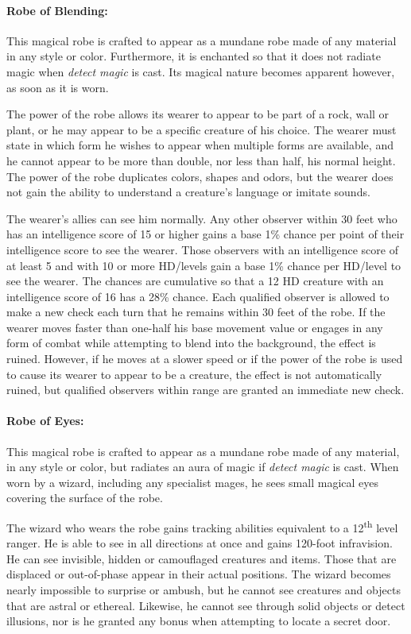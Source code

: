 \begin{multicols}{2}
\paragraph{Robe of Blending:} This magical robe is crafted to appear as a mundane robe made of any material in any style or color.  Furthermore, it is enchanted so that it does not radiate magic when \textit{detect magic} is cast.  Its magical nature becomes apparent however, as soon as it is worn.

The power of the robe allows its wearer to appear to be part of a rock, wall or plant, or he may appear to be a specific creature of his choice.  The wearer must state in which form he wishes to appear when multiple forms are available, and he cannot appear to be more than double, nor less than half, his normal height.  The power of the robe duplicates colors, shapes and odors, but the wearer does not gain the ability to understand a creature's language or imitate sounds.

The wearer's allies can see him normally.  Any other observer within 30 feet who has an intelligence score of 15 or higher gains a base 1\% chance per point of their intelligence score to see the wearer.  Those observers with an intelligence score of at least 5 and with 10 or more HD/levels gain a base 1\% chance per HD/level to see the wearer.  The chances are cumulative so that a 12 HD creature with an intelligence score of 16 has a 28\% chance.  Each qualified observer is allowed to make a new check each turn that he remains within 30 feet of the robe.  If the wearer moves faster than one-half his base movement value or engages in any form of combat while attempting to blend into the background, the effect is ruined.  However, if he moves at a slower speed or if the power of the robe is used to cause its wearer to appear to be a creature, the effect is not automatically ruined, but qualified observers within range are granted an immediate new check. 

\paragraph{Robe of Eyes:} This magical robe is crafted to appear as a mundane robe made of any material, in any style or color, but radiates an aura of magic if \textit{detect magic} is cast.  When worn by a wizard, including any specialist mages, he sees small magical eyes covering the surface of the robe.

The wizard who wears the robe gains tracking abilities equivalent to a 12\textsuperscript{th} level ranger.  He is able to see in all directions at once and gains 120-foot infravision.  He can see invisible, hidden or camouflaged creatures and items.  Those that are displaced or out-of-phase appear in their actual positions.  The wizard becomes nearly impossible to surprise or ambush, but he cannot see creatures and objects that are astral or ethereal.  Likewise, he cannot see through solid objects or detect illusions, nor is he granted any bonus when attempting to locate a secret door.


\end{multicols}
